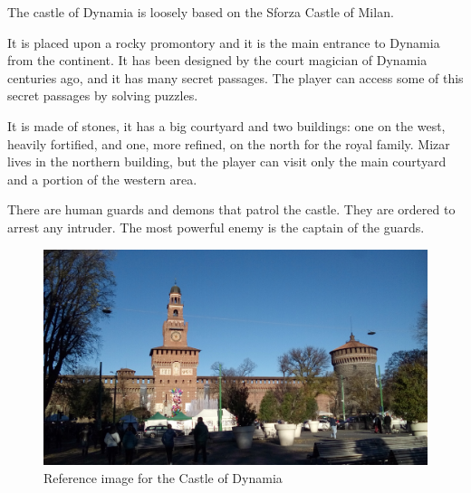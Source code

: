 The castle of Dynamia is loosely based on the Sforza Castle of Milan.

It is placed upon a rocky promontory and it is the main entrance to Dynamia from the continent. It has been designed by the court magician of Dynamia centuries ago, and it has many secret passages. The player can access some of this secret passages by solving puzzles.

It is made of stones, it has a big courtyard and two buildings: one on the west, heavily fortified, and one, more refined, on the north for the royal family. Mizar lives in the northern building, but the player can visit only the main courtyard and a portion of the western area.

There are human guards and demons that patrol the castle. They are ordered to arrest any intruder. The most powerful enemy is the captain of the guards.

\begin{figure}[H]
  \centering
  \includegraphics[width=\textwidth]{../../../References/Images/Dynamia/CastleOfDynamia/20181208_100357}
  \caption{Reference image for the Castle of Dynamia}
\end{figure}

